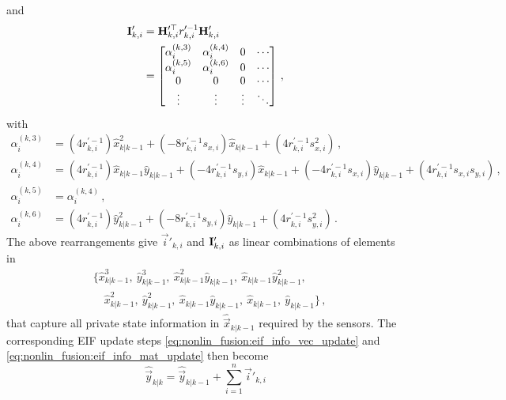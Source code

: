 and
\begin{equation}
    \begin{split}
        {\ensuremath{{\mathbf{I}}}}'_{k,i} &= {{\mathbf{H}}}_{k,i}^{\prime\top} r_{k,i}^{\prime-1}{{\mathbf{H}}}'_{k,i} \\
        &=
        \begin{bmatrix}
            \alpha_i^{(k,3)} & \alpha_i^{(k,4)} & 0 & \cdots \\
            \alpha_i^{(k,5)} & \alpha_i^{(k,6)} & 0 & \cdots\\
            0 & 0 & 0 & \cdots \\
            \vdots & \vdots & \vdots & \ddots
        \end{bmatrix}\,,
    \end{split} \label{eqn:hrh_linear_comb}
\end{equation}
with
\begin{align*}
    \alpha_i^{(k,3)} &= (4r_{k,i}^{\prime-1})\hat{x}_{k|k-1}^2 + (-8r_{k,i}^{\prime-1}s_{x,i})\hat{x}_{k|k-1} + (4r_{k,i}^{\prime-1}s_{x,i}^2)\,,\\
    \alpha_i^{(k,4)} &= (4r_{k,i}^{\prime-1})\hat{x}_{k|k-1}\hat{y}_{k|k-1} + (-4r_{k,i}^{\prime-1}s_{y,i})\hat{x}_{k|k-1} + (-4r_{k,i}^{\prime-1}s_{x,i})\hat{y}_{k|k-1} + (4r_{k,i}^{\prime-1}s_{x,i}s_{y,i})\,,\\
    \alpha_i^{(k,5)} &= \alpha_i^{(k,4)}\,,\\
    \alpha_i^{(k,6)} &= (4r_{k,i}^{\prime-1})\hat{y}_{k|k-1}^2 + (-8r_{k,i}^{\prime-1}s_{y,i})\hat{y}_{k|k-1} + (4r_{k,i}^{\prime-1}s_{y,i}^2)\,.
\end{align*}
The above rearrangements give $\vec{i}'_{k,i}$ and ${{\mathbf{I}}}'_{k,i}$ as linear combinations of elements in
\begin{equation}\label{eq:nonlin_fusion:weights_to_broadcast}
    \begin{split}
        &\{ \hat{x}_{k|k-1}^3,\ \hat{y}_{k|k-1}^3,\ \hat{x}_{k|k-1}^2\hat{y}_{k|k-1},\ \hat{x}_{k|k-1}\hat{y}_{k|k-1}^2,\\
        &\quad \hat{x}_{k|k-1}^2,\ \hat{y}_{k|k-1}^2,\ \hat{x}_{k|k-1}\hat{y}_{k|k-1},\ \hat{x}_{k|k-1},\ \hat{y}_{k|k-1}\}\,,
    \end{split}
\end{equation}
that capture all private state information in $\hat{\vec{x}}_{k|k-1}$ required by the sensors. The corresponding EIF update steps \eqref{eq:nonlin_fusion:eif_info_vec_update} and \eqref{eq:nonlin_fusion:eif_info_mat_update} then become
\begin{equation}\label{eq:nonlin_fusion:eif_modified_vec_update}
    \hat{\vec{y}}_{k|k} = \hat{\vec{y}}_{k|k-1} + \sum^n_{i=1}\vec{i}'_{k,i}
\end{equation}
